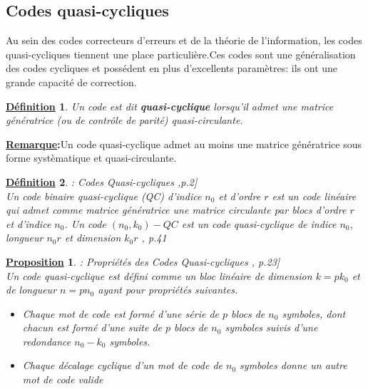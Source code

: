 \documentclass[12pt,openany]{report}
\newtheorem{proposition}{\underline{Proposition}}
\newtheorem{definition}{\underline{Définition}}
\begin{document}
\subsection{Codes quasi-cycliques}

Au sein des codes correcteurs d'erreurs et de la théorie de l'information, les codes quasi-cycliques tiennent une place particulière.Ces codes sont une généralisation des codes cycliques et possédent en plus d'excellents paramètres: ils ont une grande capacité de correction.\\
\begin{definition} Un code est dit \textbf{quasi-cyclique} lorsqu'il admet une matrice génératrice (ou de contrôle de parité) quasi-circulante.
\end{definition}
\textbf{\underline{Remarque}:}Un code quasi-cyclique admet au moins une matrice génératrice sous forme systèmatique et quasi-circulante.
\begin{definition}: Codes Quasi-cycliques \cite{N.Apon},p.2]\\
Un code binaire quasi-cyclique (QC)
d'indice $n_0$ et d'ordre $r$ est un code linéaire qui admet comme matrice génératrice une matrice circulante par blocs d'ordre $r$ et d'indice $n_0$. Un code $(n_0, k_0)-QC$ est un code quasi-cyclique de
indice $n_0$, longueur $n_0r$ et dimension $k_0r$ \cite{baldi2014}, p.41
\end{definition}
\begin{proposition}: Propriétés des Codes Quasi-cycliques \cite{baldi2020}, p.23]\\
Un code quasi-cyclique est
défini comme un bloc linéaire de dimension $k = pk_0$ et de longueur $n = pn_0$ ayant pour
propriétés suivantes.
\begin{itemize}
\item[(i)]Chaque mot de code est formé d'une série de $p$ blocs de $n_0$ symboles, dont chacun
est formé d'une suite de $p$ blocs de $n_0$ symboles suivis d'une redondance $n_0-k_0$
symboles.
\item[(ii)]  Chaque décalage cyclique d'un mot de code de $n_0$ symboles donne un autre mot de code valide
\end{itemize}
\end{proposition}
\end{document}
